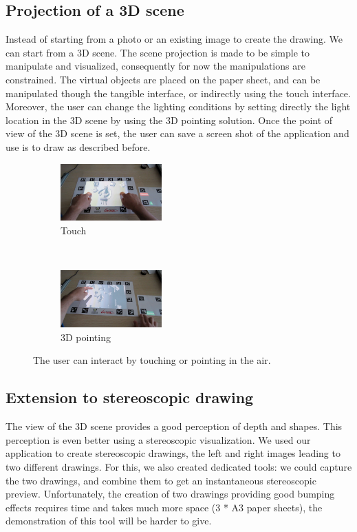 \documentclass{article}
\begin{document}
\subsection{Projection of a 3D scene}
Instead of starting from a photo or an existing image to create the drawing. We can start from a 3D scene. The scene projection is made to be simple to manipulate and visualized, consequently for now the manipulations are constrained. The virtual objects are placed on the paper sheet, and can be manipulated though the tangible interface, or indirectly using the touch interface. Moreover, the user can change the lighting conditions by setting directly the light location in the 3D scene by using the 3D pointing solution. Once the point of view of the 3D scene is set, the user can save a screen shot of the application and use is to draw as described before. 


\begin{figure}[!h]
        \begin{subfigure}[b]{0.20\textwidth}
                \centering
                \includegraphics[width=3.9cm]{touch}
                \caption{Touch}
                \label{fig:touch}
        \end{subfigure}%
        ~ %
        \begin{subfigure}[b]{0.25\textwidth}
                \centering
                \includegraphics[width=3.9cm]{point}
                \caption{3D pointing}
                \label{fig:point}
        \end{subfigure}
        \caption{The user can interact by touching or pointing in the air.}\label{fig:inter}
\end{figure}

\subsection{Extension to stereoscopic drawing} 
The view of the 3D scene provides a good perception of depth and shapes. This perception is even better using a stereoscopic visualization. We used our application to create stereoscopic drawings, the left and right images leading to two different drawings. For this, we also created dedicated tools: we could capture the two drawings, and combine them to get an instantaneous stereoscopic preview. Unfortunately, the creation of two drawings providing good bumping effects requires time and takes much more space (3 * A3 paper sheets), the demonstration of this tool will be harder to give.  
\end{document}
